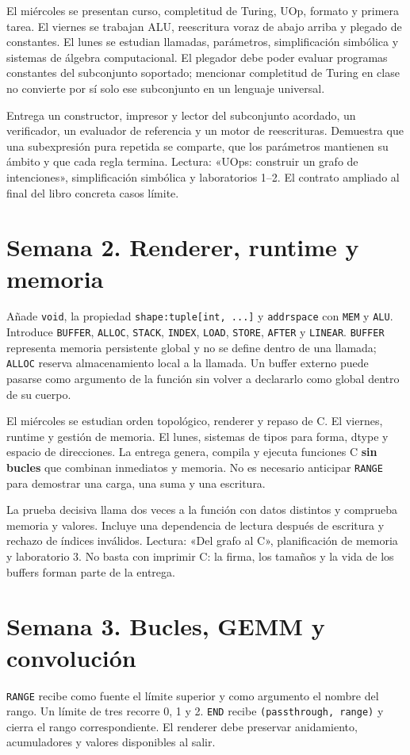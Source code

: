 \documentclass[12pt,a4paper,oneside]{report}
\begin{document}
El miércoles se presentan curso, completitud de Turing, UOp, formato y primera tarea. El viernes se trabajan ALU, reescritura voraz de abajo arriba y plegado de constantes. El lunes se estudian llamadas, parámetros, simplificación simbólica y sistemas de álgebra computacional. El plegador debe poder evaluar programas constantes del subconjunto soportado; mencionar completitud de Turing en clase no convierte por sí solo ese subconjunto en un lenguaje universal.

Entrega un constructor, impresor y lector del subconjunto acordado, un verificador, un evaluador de referencia y un motor de reescrituras. Demuestra que una subexpresión pura repetida se comparte, que los parámetros mantienen su ámbito y que cada regla termina. Lectura: «UOps: construir un grafo de intenciones», simplificación simbólica y laboratorios 1--2. El contrato ampliado al final del libro concreta casos límite.

\section{Semana 2. Renderer, runtime y memoria}
Añade \texttt{void}, la propiedad \texttt{shape:tuple[\allowbreak{}int, ...]} y \texttt{addrspace} con \texttt{MEM} y \texttt{ALU}. Introduce \texttt{BUFFER}, \texttt{ALLOC}, \texttt{STACK}, \texttt{INDEX}, \texttt{LOAD}, \texttt{STORE}, \texttt{AFTER} y \texttt{LINEAR}. \texttt{BUFFER} representa memoria persistente global y no se define dentro de una llamada; \texttt{ALLOC} reserva almacenamiento local a la llamada. Un buffer externo puede pasarse como argumento de la función sin volver a declararlo como global dentro de su cuerpo.

El miércoles se estudian orden topológico, renderer y repaso de C. El viernes, runtime y gestión de memoria. El lunes, sistemas de tipos para forma, dtype y espacio de direcciones. La entrega genera, compila y ejecuta funciones C \textbf{sin bucles} que combinan inmediatos y memoria. No es necesario anticipar \texttt{RANGE} para demostrar una carga, una suma y una escritura.

La prueba decisiva llama dos veces a la función con datos distintos y comprueba memoria y valores. Incluye una dependencia de lectura después de escritura y rechazo de índices inválidos. Lectura: «Del grafo al C», planificación de memoria y laboratorio 3. No basta con imprimir C: la firma, los tamaños y la vida de los buffers forman parte de la entrega.

\section{Semana 3. Bucles, GEMM y convolución}
\texttt{RANGE} recibe como fuente el límite superior y como argumento el nombre del rango. Un límite de tres recorre 0, 1 y 2. \texttt{END} recibe \texttt{(passthrough, range)} y cierra el rango correspondiente. El renderer debe preservar anidamiento, acumuladores y valores disponibles al salir.
\end{document}
